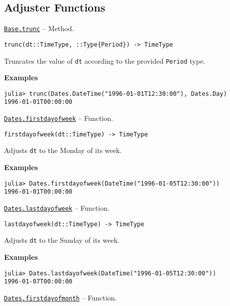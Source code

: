 \hypertarget{13551592780469201884}{}


\subsection{Adjuster Functions}


\hypertarget{173413331178974124}{} 
\hyperlink{173413331178974124}{\texttt{Base.trunc}}  -- {Method.}

\begin{adjustwidth}{2em}{0pt}


\begin{verbatim}
trunc(dt::TimeType, ::Type{Period}) -> TimeType
\end{verbatim}

Truncates the value of \texttt{dt} according to the provided \texttt{Period} type.

\textbf{Examples}


\begin{verbatim}
julia> trunc(Dates.DateTime("1996-01-01T12:30:00"), Dates.Day)
1996-01-01T00:00:00
\end{verbatim}



\end{adjustwidth}
\hypertarget{725369720992290901}{} 
\hyperlink{725369720992290901}{\texttt{Dates.firstdayofweek}}  -- {Function.}

\begin{adjustwidth}{2em}{0pt}


\begin{verbatim}
firstdayofweek(dt::TimeType) -> TimeType
\end{verbatim}

Adjusts \texttt{dt} to the Monday of its week.

\textbf{Examples}


\begin{verbatim}
julia> Dates.firstdayofweek(DateTime("1996-01-05T12:30:00"))
1996-01-01T00:00:00
\end{verbatim}



\end{adjustwidth}
\hypertarget{15555713849502356755}{} 
\hyperlink{15555713849502356755}{\texttt{Dates.lastdayofweek}}  -- {Function.}

\begin{adjustwidth}{2em}{0pt}


\begin{verbatim}
lastdayofweek(dt::TimeType) -> TimeType
\end{verbatim}

Adjusts \texttt{dt} to the Sunday of its week.

\textbf{Examples}


\begin{verbatim}
julia> Dates.lastdayofweek(DateTime("1996-01-05T12:30:00"))
1996-01-07T00:00:00
\end{verbatim}



\end{adjustwidth}
\hypertarget{944292496394173921}{} 
\hyperlink{944292496394173921}{\texttt{Dates.firstdayofmonth}}  -- {Function.}

